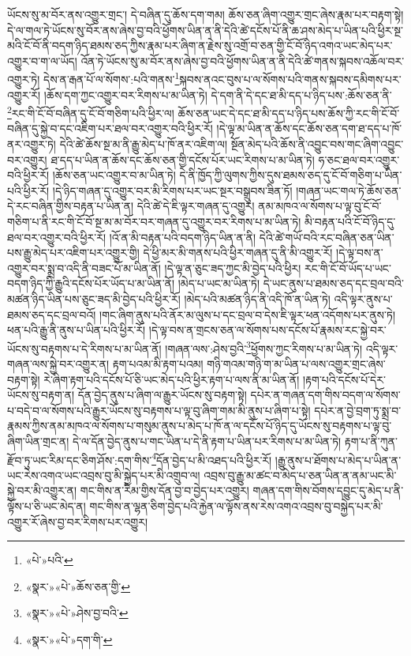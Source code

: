 ཡོངས་སུ་མ་བོར་ནས་འགྱུར་གྲང་། དེ་བཞིན་དུ་ཆོས་དག་གམ། ཆོས་ཅན་ཞིག་འགྱུར་གྲང་ཞེས་རྣམ་པར་བརྟག་སྟེ། དེ་ལ་གལ་ཏེ་ཡོངས་སུ་བོར་ནས་ཞེས་བྱ་བའི་ཕྱོགས་ཡིན་ན་ནི་དེའི་ཚེ་དངོས་པོ་ནི་ཆ་ཤས་མེད་པ་ཡིན་པའི་ཕྱིར་སྔ་མའི་ངོ་བོ་ནི་བདག་ཉིད་ཐམས་ཅད་ཀྱིས་རྣམ་པར་ཞིག་ན་རྗེས་སུ་འགྲོ་བ་ཅན་གྱི་ངོ་བོ་ཉིད་འགའ་ཡང་མེད་པར་འགྱུར་བ་ག་ལ་ཡོད། འོན་ཏེ་ཡོངས་སུ་མ་བོར་ནས་ཞེས་བྱ་བའི་ཕྱོགས་ཡིན་ན་ནི་དེའི་ཚེ་གནས་སྐབས་འཆོལ་བར་འགྱུར་ཏེ། དེས་ན་རྒན་པོ་ལ་སོགས་:པའི་གནས་\footnote{«པེ་»པའི་}སྐབས་ནའང་བུས་པ་ལ་སོགས་པའི་གནས་སྐབས་དམིགས་པར་འགྱུར་རོ། །ཆོས་དག་ཀྱང་འགྱུར་བར་རིགས་པ་མ་ཡིན་ཏེ། དེ་དག་ནི་དེ་དང་ཐ་མི་དད་པ་ཉིད་པས་:ཆོས་ཅན་ནི་\footnote{«སྣར་»«པེ་»ཆོས་ཅན་གྱི་}རང་གི་ངོ་བོ་བཞིན་དུ་ངོ་བོ་གཅིག་པའི་ཕྱིར་ལ། ཆོས་ཅན་ཡང་དེ་དང་ཐ་མི་དད་པ་ཉིད་པས་ཆོས་ཀྱི་རང་གི་ངོ་བོ་བཞིན་དུ་སྐྱེ་བ་དང་འཇིག་པར་ཐལ་བར་འགྱུར་བའི་ཕྱིར་རོ། །དེ་ལྟ་མ་ཡིན་ན་ཆོས་དང་ཆོས་ཅན་དག་ཐ་དད་པ་ཁོ་ནར་འགྱུར་ཏེ། དེའི་ཚེ་ཆོས་སྔ་མ་ནི་རྒྱུ་མེད་པ་ཁོ་ནར་འཇིག་ལ། སྔོན་མེད་པའི་ཆོས་ནི་འབྱུང་བས་གང་ཞིག་འབྱུང་བར་འགྱུར། ཐ་དད་པ་ཡིན་ན་ཆོས་དང་ཆོས་ཅན་གྱི་དངོས་པོར་ཡང་རིགས་པ་མ་ཡིན་ཏེ། ཧ་ཅང་ཐལ་བར་འགྱུར་བའི་ཕྱིར་རོ། །ཆོས་ཅན་ཡང་འགྱུར་བ་མ་ཡིན་ཏེ། དེ་ནི་ཁྱོད་ཀྱི་ལུགས་ཀྱིས་དུས་ཐམས་ཅད་དུ་ངོ་བོ་གཅིག་པ་ཡིན་པའི་ཕྱིར་རོ། །དེ་ཉིད་གཞན་དུ་འགྱུར་བར་མི་རིགས་པར་ཡང་སྔར་བསྒྲུབས་ཟིན་ཏོ། །གཞན་ཡང་གལ་ཏེ་ཆོས་ཅན་དེ་རང་བཞིན་གྱིས་བརྟན་པ་ཡིན་ན། དེའི་ཚེ་དེ་ཇི་ལྟར་གཞན་དུ་འགྱུར། ནམ་མཁའ་ལ་སོགས་པ་ལྟ་བུ་ངོ་བོ་གཅིག་པ་ནི་རང་གི་ངོ་བོ་སྔ་མ་མ་བོར་བར་གཞན་དུ་འགྱུར་བར་རིགས་པ་མ་ཡིན་ཏེ། མི་བརྟན་པའི་ངོ་བོ་ཉིད་དུ་ཐལ་བར་འགྱུར་བའི་ཕྱིར་རོ། །འོ་ན་མི་བརྟན་པའི་བདག་ཉིད་ཡིན་ན་ནི། དེའི་ཚེ་གཡོ་བའི་རང་བཞིན་ཅན་ཡིན་པས་རྒྱུ་མེད་པར་འཇིག་པར་འགྱུར་གྱི། དེ་ཕྱི་མར་མི་གནས་པའི་ཕྱིར་གཞན་དུ་ནི་མི་འགྱུར་རོ། །དེ་ལྟ་བས་ན་འགྱུར་བར་སྨྲ་བ་འདི་ནི་བཟང་པོ་མ་ཡིན་ནོ། །དེ་ལྟ་ན་ཅུང་ཟད་ཀྱང་མི་བྱེད་པའི་ཕྱིར། རང་གི་ངོ་བོ་ཡོད་པ་ཡང་བདག་ཉིད་ཀྱི་རྒྱུའི་དངོས་པོར་ཡོད་པ་མ་ཡིན་ནོ། །མེད་པ་ཡང་མ་ཡིན་ཏེ། དེ་ཡང་ནུས་པ་ཐམས་ཅད་དང་བྲལ་བའི་མཚན་ཉིད་ཡིན་པས་ཅུང་ཟད་མི་བྱེད་པའི་ཕྱིར་རོ། །མེད་པའི་མཚན་ཉིད་ནི་འདི་ཁོ་ན་ཡིན་ཏེ། འདི་ལྟར་ནུས་པ་ཐམས་ཅད་དང་བྲལ་བའོ། །གང་ཞིག་ནུས་པའི་ནོར་མ་ལུས་པ་དང་བྲལ་བ་དེས་ཇི་ལྟར་ཕན་འདོགས་པར་ནུས་ཏེ། ཕན་པའི་རྒྱུ་ནི་ནུས་པ་ཡིན་པའི་ཕྱིར་རོ། །དེ་ལྟ་བས་ན་གྲངས་ཅན་ལ་སོགས་པས་དངོས་པོ་རྣམས་རང་སྐྱེ་བར་ཡོངས་སུ་བརྟགས་པ་དེ་རིགས་པ་མ་ཡིན་ནོ། །གཞན་ལས་:ཤེས་བྱའི་\footnote{«སྣར་»«པེ་»ཤེས་བྱ་བའི་}ཕྱོགས་ཀྱང་རིགས་པ་མ་ཡིན་ཏེ། འདི་ལྟར་གཞན་ལས་སྐྱེ་བར་འགྱུར་ན། རྟག་པའམ་མི་རྟག་པའམ། གཉི་གའམ་གཉི་ག་མ་ཡིན་པ་ལས་འགྱུར་གྲང་ཞེས་བརྟག་སྟེ། རེ་ཞིག་རྟག་པའི་དངོས་པོ་ཅི་ཡང་མེད་པའི་ཕྱིར་རྟག་པ་ལས་ནི་མ་ཡིན་ནོ། །རྟག་པའི་དངོས་པོ་དེར་ཡོངས་སུ་བརྟག་ན། དོན་བྱེད་ནུས་པ་ཞིག་ལ་རྒྱུར་ཡོངས་སུ་བརྟག་སྟེ། དཔེར་ན་གཞན་དག་གིས་བདག་ལ་སོགས་པ་བདེ་བ་ལ་སོགས་པའི་རྒྱུར་ཡོངས་སུ་བརྟགས་པ་ལྟ་བུ་ཞིག་གམ་མི་ནུས་པ་ཞིག་པ་སྟེ། དཔེར་ན་བྱེ་བྲག་ཏུ་སྨྲ་བ་རྣམས་ཀྱིས་ནམ་མཁའ་ལ་སོགས་པ་གསུམ་ནུས་པ་མེད་པ་ཁོ་ན་ལ་དངོས་པོ་ཉིད་དུ་ཡོངས་སུ་བརྟགས་པ་ལྟ་བུ་ཞིག་ཡིན་གྲང་ན། དེ་ལ་དོན་བྱེད་ནུས་པ་གང་ཡིན་པ་དེ་ནི་རྟག་པ་ཡིན་པར་རིགས་པ་མ་ཡིན་ཏེ། རྟག་པ་ནི་ཀུན་རྫོབ་ཏུ་ཡང་རིམ་དང་ཅིག་ཤོས་:དག་གིས་\footnote{«སྣར་»«པེ་»དག་གི་}དོན་བྱེད་པ་མི་འཐད་པའི་ཕྱིར་རོ། །རྒྱུ་ནུས་པ་ཐོགས་པ་མེད་པ་ཡིན་ན་ཡང་རེས་འགའ་ཡང་འབྲས་བུ་མི་སྐྱེད་པར་མི་འགྲུབ་ལ། འབྲས་བུ་རྒྱུ་མ་ཚང་བ་མེད་པ་ཅན་ཡིན་ན་ནམ་ཡང་མི་སྐྱེ་བར་མི་འགྱུར་ན། གང་གིས་ན་རིམ་གྱིས་དོན་བྱ་བ་བྱེད་པར་འགྱུར། གཞན་དག་གིས་བོགས་དབྱུང་དུ་མེད་པ་ནི་ལྟོས་པ་ཅི་ཡང་མེད་ན། གང་གིས་ན་ལྷན་ཅིག་བྱེད་པའི་རྐྱེན་ལ་ལྟོས་ནས་རེས་འགའ་འབྲས་བུ་བསྐྱེད་པར་མི་འགྱུར་རོ་ཞེས་བྱ་བར་རིགས་པར་འགྱུར། 
